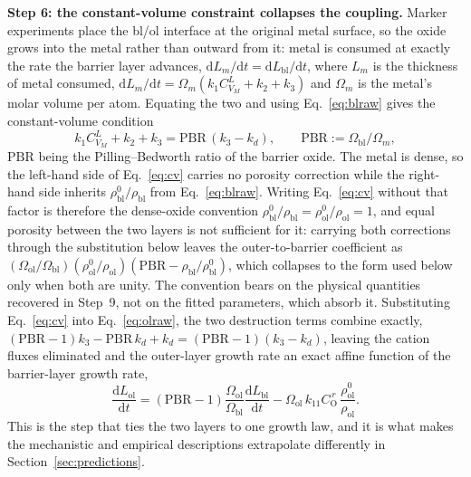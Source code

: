 \documentclass[pdflatex,sn-nature]{sn-jnl}
\begin{document}
\textbf{Step 6: the constant-volume constraint collapses the coupling.}
Marker experiments place the bl/ol interface at the original metal
surface, so the oxide grows into the metal rather than outward from it:
metal is consumed at exactly the rate the barrier layer advances,
$\mathrm{d}L_m/\mathrm{d}t = \mathrm{d}L_\text{bl}/\mathrm{d}t$, where
$L_m$ is the thickness of metal consumed,
$\mathrm{d}L_m/\mathrm{d}t = \Omega_m (k_1 C_{V_M}^{L} + k_2 + k_3)$ and
$\Omega_m$ is the metal's molar volume per atom. Equating the two and using
Eq.~\eqref{eq:blraw} gives the constant-volume condition
\begin{equation}
k_1 C_{V_M}^{L} + k_2 + k_3 = \mathrm{PBR}\,(k_3 - k_d),
\qquad
\mathrm{PBR} := \Omega_\text{bl}/\Omega_m ,
\label{eq:cv}
\end{equation}
$\mathrm{PBR}$ being the Pilling--Bedworth ratio of the barrier oxide.
The metal is dense, so the left-hand side of Eq.~\eqref{eq:cv} carries no
porosity correction while the right-hand side inherits
$\rho^0_\text{bl}/\rho_\text{bl}$ from Eq.~\eqref{eq:blraw}. Writing
Eq.~\eqref{eq:cv} without that factor is therefore the dense-oxide
convention $\rho^0_\text{bl}/\rho_\text{bl} =
\rho^0_\text{ol}/\rho_\text{ol} = 1$, and equal porosity between the two
layers is not sufficient for it: carrying both corrections through the
substitution below leaves the outer-to-barrier coefficient as
$(\Omega_\text{ol}/\Omega_\text{bl})(\rho^0_\text{ol}/\rho_\text{ol})
(\mathrm{PBR} - \rho_\text{bl}/\rho^0_\text{bl})$, which collapses to the
form used below only when both are unity. The convention bears on the
physical quantities recovered in Step~9, not on the fitted parameters,
which absorb it.
Substituting Eq.~\eqref{eq:cv} into Eq.~\eqref{eq:olraw}, the two
destruction terms combine exactly, $(\mathrm{PBR}-1)k_3 -
\mathrm{PBR}\,k_d + k_d = (\mathrm{PBR}-1)(k_3-k_d)$, leaving the
cation fluxes eliminated and the outer-layer growth rate an exact affine
function of the barrier-layer growth rate,
\begin{equation}
\frac{\mathrm{d}L_\text{ol}}{\mathrm{d}t}
= (\mathrm{PBR}-1)\frac{\Omega_\text{ol}}{\Omega_\text{bl}}
\frac{\mathrm{d}L_\text{bl}}{\mathrm{d}t}
- \Omega_\text{ol}\, k_{11} C_\mathrm{O}^{\,r}\,
\frac{\rho^0_\text{ol}}{\rho_\text{ol}} .
\label{eq:olcoupled}
\end{equation}
This is the step that ties the two layers to one growth law, and it is
what makes the mechanistic and empirical descriptions extrapolate
differently in Section~\ref{sec:predictions}.
\end{document}
